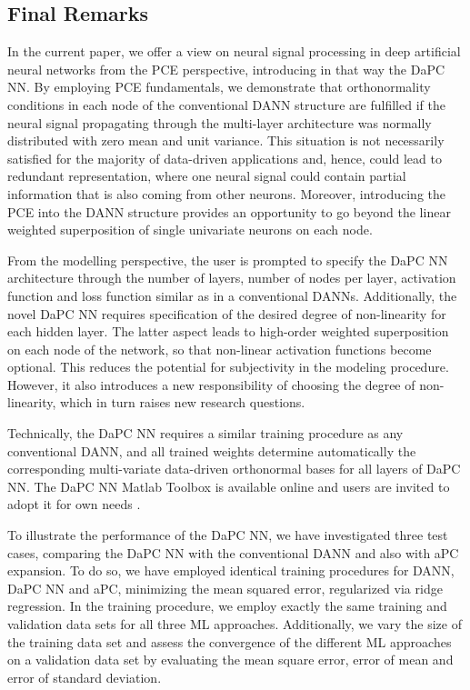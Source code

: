 \documentclass[a4paper,fleqn]{article}
\newcommand{\rw}[1]{\textcolor{blue}{#1}}
\newcommand{\del}[1]{\textcolor{red}{\sout{#1}}}
\renewcommand{\del}[1]{}
\renewcommand{\rw}[1]{#1}
\begin{document}
\subsection{Final Remarks}
In the current paper, we offer a view on neural signal processing in deep artificial neural networks from the PCE perspective, introducing in that way the DaPC NN. By employing PCE fundamentals, we demonstrate that orthonormality conditions in each node of the conventional DANN structure are fulfilled if the neural signal propagating through the multi-layer architecture was normally distributed with zero mean and unit variance. This situation is not necessarily satisfied for the majority of data-driven applications and, hence, could lead to redundant representation, where one neural signal could contain partial information that is also coming from other neurons. Moreover, introducing the PCE into the DANN structure provides an opportunity to go beyond the linear weighted superposition of single \rw{univariate} neurons on each node.

From the modelling perspective, the user is prompted to specify the DaPC NN architecture through the number of layers, number of nodes per layer, activation function and loss function similar as in a conventional DANNs. Additionally, the novel DaPC NN requires specification of the desired degree of non-linearity for each hidden layer. The latter aspect leads to high-order weighted superposition on each node of the network, so that non-linear activation functions become optional. This reduces the potential for subjectivity in the modeling procedure. \rw{However, it also introduces a new responsibility of choosing the degree of non-linearity, which in turn raises new research questions.}

Technically, the DaPC NN requires a similar training procedure as any conventional DANN, and all trained weights determine automatically the corresponding multi-variate data-driven orthonormal bases for all layers of DaPC NN. The DaPC NN Matlab Toolbox is available online and users are invited to adopt it for own needs \del{[CITE]} \rw{\cite{DaPC-NN_Toolbox}}.

To illustrate the performance of the DaPC NN, we have \del{conceded} \rw{investigated} three test cases, comparing the DaPC NN with the conventional DANN and also with aPC expansion. 
To do so, we have employed identical training procedures for DANN, DaPC NN and aPC, minimizing the mean squared error, regularized via ridge regression. In the training procedure, we employ exactly the same training and validation data sets for all three ML approaches. Additionally, we vary the size of the training data set and assess the convergence of the different ML approaches on a validation data set by evaluating the mean square error, error of mean and error of standard deviation.
\end{document}
